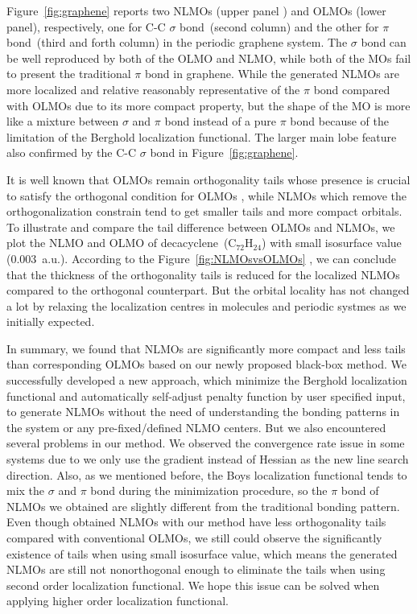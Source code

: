 \documentclass[aps,prl,reprint,amsmath,amssymb]{revtex4-1}
\begin{document}
Figure~\ref{fig:graphene} reports two NLMOs (upper panel ) and OLMOs (lower panel), respectively, one for C-C $\sigma$ bond~(second column) and the other for $\pi$ bond~(third and forth column) in the periodic graphene system.
The $\sigma$ bond can be well reproduced by both of the OLMO and NLMO, while both of the MOs fail to present the traditional $\pi$ bond in graphene.
While the generated NLMOs are more localized and  relative reasonably representative of the $\pi$ bond compared with OLMOs due to its more compact property, but the shape of the MO is more like a mixture between $\sigma$ and $\pi$ bond instead of a pure $\pi$ bond because of the limitation of the Berghold localization functional.
The larger main lobe feature also confirmed by the C-C $\sigma$ bond in Figure~\ref{fig:graphene}.

It is well known that OLMOs remain orthogonality tails whose presence is crucial to satisfy the orthogonal condition for OLMOs , while NLMOs which remove the orthogonalization constrain tend to get smaller tails and more compact orbitals. 
To illustrate and compare the tail difference between OLMOs and NLMOs, we plot the NLMO and OLMO of decacyclene~(C$_{72}$H$_{24}$) with small isosurface value (0.003~a.u.).
According to the Figure~\ref{fig:NLMOsvsOLMOs} , we can conclude that the thickness of the orthogonality tails is reduced for the localized NLMOs compared to the orthogonal counterpart.
But the orbital locality has not changed a lot by relaxing the localization centres in molecules and periodic systmes as we initially expected.

In summary, we found that NLMOs are significantly more compact and less tails than corresponding OLMOs based on our newly proposed black-box method. 
We successfully developed a new approach, which minimize the Berghold localization functional and automatically self-adjust penalty function by user specified input, to generate NLMOs without the need of understanding the bonding patterns in the system or any pre-fixed/defined NLMO centers.
But we also encountered several problems  in our method.
We observed the convergence rate issue in some systems due to we only use the gradient instead of Hessian as the new line search direction.
Also, as we mentioned before, the Boys localization functional tends to mix the $\sigma$ and $\pi$ bond during the minimization procedure, so the $\pi$ bond of NLMOs we obtained are slightly different from the traditional bonding pattern.
Even though obtained NLMOs with our method have less orthogonality tails compared with conventional OLMOs, we still could observe the significantly existence of tails when using small isosurface value, which means the generated NLMOs are still not nonorthogonal enough to eliminate the tails when using second order localization functional. 
We hope this issue can be solved when applying higher order localization functional.
\end{document}
